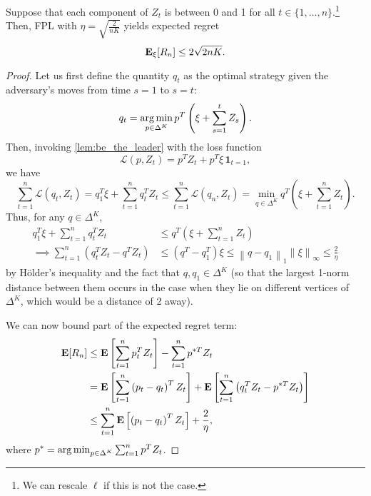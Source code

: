 \begin{theorem} \label{thm:FPL_regret} Suppose that each component of $Z_t$ is between 0 and 1 for all $t \in \{1, \ldots, n\}$.\footnote{We can rescale $\ell$ if this is not the case.} Then, FPL with $\eta = \sqrt{\frac{2}{nK}}$ yields expected regret
\begin{equation}\label{eqn:FPL_regret}
\mathbf{E}_\xi [R_n] \leq 2 \sqrt{2 n K}.
\end{equation}

\begin{proof}
Let us first define the quantity $q_t$ as the optimal strategy given the adversary's moves from time $s=1$ to $s = t$:
\[
q_t = \operatorname*{arg\,min}_{p \in \Delta^K} p^T \left(\xi + \sum_{s = 1}^t Z_s\right).
\]
Then, invoking \autoref{lem:be_the_leader} with the loss function
\[
\mathcal{L} (p, Z_t) = p^T Z_t + p^T \xi\, \mathbf{1}_{t = 1},
\]
we have
\[
\sum_{t=1}^n \mathcal{L}(q_t, Z_t) = q_1^T \xi + \sum_{t=1}^n q_t^T Z_t \leq \sum_{t=1}^n \mathcal{L}(q_n, Z_t) = \min_{q \in \Delta^K} q^T \left(\xi + \sum_{t=1}^n Z_t\right).
\]
Thus, for any $q \in \Delta^K$,
\begin{align*}
q_1^T \xi + \sum_{t=1}^n q_t^T Z_t &\leq q^T \left(\xi + \sum_{t=1}^n Z_t\right) \\
\implies \sum_{t=1}^n\left(q_t^T Z_t - q^T Z_t\right) &\leq \left(q^T - q_1^T\right) \xi \leq \left\|q - q_1\right\|_1 \left\|\xi\right\|_{\infty} \leq \frac{2}{\eta}
\end{align*}
by H\"older's inequality and the fact that $q, q_1 \in \Delta^K$ (so that the largest 1-norm distance between them occurs in the case when they lie on different vertices of $\Delta^K$, which would be a distance of 2 away).

We can now bound part of the expected regret term:
\begin{align}
\mathbf{E} [R_n] &\leq \mathbf{E}\left[ \sum_{t=1}^n p_t^T Z_t\right] - \sum_{t=1}^n p^{*T}Z_t \nonumber\\
&= \mathbf{E} \left[\sum_{t=1}^n \left(p_t - q_t\right)^T Z_t\right] + \mathbf{E}\left[\sum_{t=1}^n \left(q_t^T Z_t - p^{*T} Z_t \right) \right]\nonumber \\
&\leq \sum_{t=1}^n \mathbf{E}\left[\left(p_t - q_t \right)^T Z_t \right] + \frac{2}{\eta},\label{eqn:e_regret_half}
\end{align}
where $p^* = \operatorname*{arg\,min}_{p \in \Delta^K} \sum_{t=1}^n p^T Z_t$.


\end{proof}
\end{theorem}
